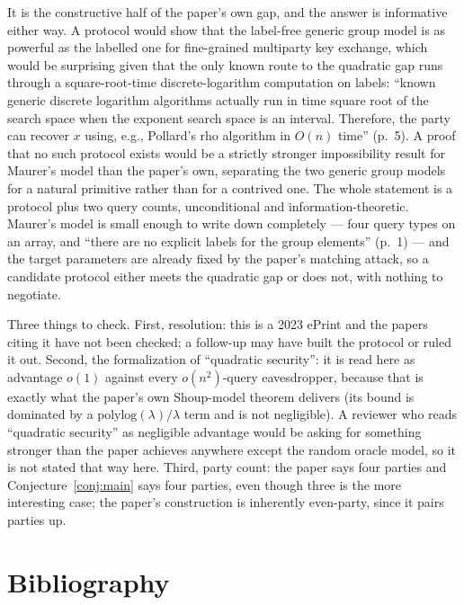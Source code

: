 \documentclass{conjura-conjecture}
\newcommand{\polylog}{\mathrm{polylog}}
\begin{document}
\begin{remark}\label{rem:why}
It is the constructive half of the paper's own gap, and the answer is
informative either way. A protocol would show that the label-free
generic group model is as powerful as the labelled one for fine-grained
multiparty key exchange, which would be surprising given that the only
known route to the quadratic gap runs through a square-root-time
discrete-logarithm computation on labels: ``known generic discrete
logarithm algorithms actually run in time square root of the search
space when the exponent search space is an interval. Therefore, the
party can recover $x$ using, e.g., Pollard's rho algorithm in $O(n)$
time'' (p.~5). A proof that no such protocol exists would be a strictly
stronger impossibility result for Maurer's model than the paper's own,
separating the two generic group models for a natural primitive rather
than for a contrived one. The whole statement is a protocol plus two
query counts, unconditional and information-theoretic. Maurer's model is
small enough to write down completely --- four query types on an array,
and ``there are no explicit labels for the group elements'' (p.~1) ---
and the target parameters are already fixed by the paper's matching
attack, so a candidate protocol either meets the quadratic gap or does
not, with nothing to negotiate.
\end{remark}

\begin{remark}\label{rem:caveats}
Three things to check. First, resolution: this is a 2023 ePrint and the
papers citing it have not been checked; a follow-up may have built the
protocol or ruled it out. Second, the formalization of ``quadratic
security'': it is read here as advantage $o(1)$ against every
$o(n^{2})$-query eavesdropper, because that is exactly what the paper's
own Shoup-model theorem delivers (its bound is dominated by a
$\polylog(\lambda)/\lambda$ term and is not negligible). A reviewer who
reads ``quadratic security'' as negligible advantage would be asking for
something stronger than the paper achieves anywhere except the random
oracle model, so it is not stated that way here. Third, party count: the
paper says four parties and Conjecture~\ref{conj:main} says four
parties, even though three is the more interesting case; the paper's
construction is inherently even-party, since it pairs parties up.
\end{remark}

\section{Bibliography}
\end{document}
